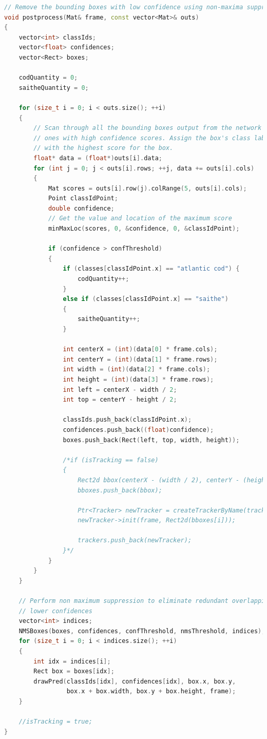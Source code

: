 \begin{lstlisting}[language=C++, caption=main.cpp]
// Remove the bounding boxes with low confidence using non-maxima suppression
void postprocess(Mat& frame, const vector<Mat>& outs)
{
    vector<int> classIds;
    vector<float> confidences;
    vector<Rect> boxes;

    codQuantity = 0;
    saitheQuantity = 0;

    for (size_t i = 0; i < outs.size(); ++i)
    {
        // Scan through all the bounding boxes output from the network and keep only the
        // ones with high confidence scores. Assign the box's class label as the class
        // with the highest score for the box.
        float* data = (float*)outs[i].data;
        for (int j = 0; j < outs[i].rows; ++j, data += outs[i].cols)
        {
            Mat scores = outs[i].row(j).colRange(5, outs[i].cols);
            Point classIdPoint;
            double confidence;
            // Get the value and location of the maximum score
            minMaxLoc(scores, 0, &confidence, 0, &classIdPoint);

            if (confidence > confThreshold)
            {
                if (classes[classIdPoint.x] == "atlantic cod") {
                    codQuantity++;
                }
                else if (classes[classIdPoint.x] == "saithe")
                {
                    saitheQuantity++;
                }

                int centerX = (int)(data[0] * frame.cols);
                int centerY = (int)(data[1] * frame.rows);
                int width = (int)(data[2] * frame.cols);
                int height = (int)(data[3] * frame.rows);
                int left = centerX - width / 2;
                int top = centerY - height / 2;

                classIds.push_back(classIdPoint.x);
                confidences.push_back((float)confidence);
                boxes.push_back(Rect(left, top, width, height));

                /*if (isTracking == false)
                {
                    Rect2d bbox(centerX - (width / 2), centerY - (height / 2), width, height); // KCF works best with a tight crop
                    bboxes.push_back(bbox);

                    Ptr<Tracker> newTracker = createTrackerByName(trackerTypes[2]); // Use KCF
                    newTracker->init(frame, Rect2d(bboxes[i]));

                    trackers.push_back(newTracker);
                }*/
            }
        }
    }

    // Perform non maximum suppression to eliminate redundant overlapping boxes with
    // lower confidences
    vector<int> indices;
    NMSBoxes(boxes, confidences, confThreshold, nmsThreshold, indices);
    for (size_t i = 0; i < indices.size(); ++i)
    {
        int idx = indices[i];
        Rect box = boxes[idx];
        drawPred(classIds[idx], confidences[idx], box.x, box.y,
                 box.x + box.width, box.y + box.height, frame);
    }

    //isTracking = true;
}
\end{lstlisting}

